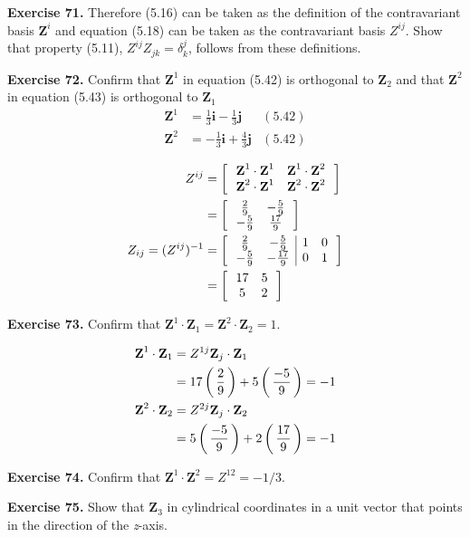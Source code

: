 \documentclass[12pt,a4paper]{report}
\newcommand{\BLUE}[1]{\textcolor{blue}{#1}}
\newcommand{\VK}[1]{\textbf{#1}}
\begin{document}
\begin{description}
\item \textbf{Exercise 71.}  Therefore (5.16) can be taken as the definition of the contravariant basis $\VK{Z}^i$ and equation (5.18) can be taken as the contravariant basis $Z^{ij}$.  Show that property (5.11), $Z^{ij}Z_{jk}=\delta^j_k$, follows from these definitions.  

\item \textbf{Exercise 72.}  Confirm that $\VK{Z}^1$ in equation (5.42) is orthogonal to $\VK{Z}_2$ and that $\VK{Z}^2$ in equation (5.43) is orthogonal to $\VK{Z}_1$
\begin{align*}
	\VK{Z}^1 &= \frac{1}{3}\textbf{i}-\frac{1}{3}\textbf{j} & (5.42) \\
	\VK{Z}^2 &= -\frac{1}{3}\textbf{i}+\frac{4}{3}\textbf{j} & (5.42)
\end{align*}

\BLUE{\begin{align*}
	Z^{ij} &= \SQTWOXTWO{\VK{Z}^1\cdot\VK{Z}^1}{\VK{Z}^1\cdot\VK{Z}^2}{\VK{Z}^2\cdot\VK{Z}^1}{\VK{Z}^2\cdot\VK{Z}^2} \\
	&= \SQTWOXTWO{\frac{2}{9}}{-\frac{5}{9}}{-\frac{5}{9}}{\frac{17}{9}} \\
	Z_{ij} = (Z^{ij})^{-1} &= \SQBRACKET{\begin{array}{cc|cc}
		\frac{2}{9} & -\frac{5}{9} & 1 & 0 \\
		-\frac{5}{9} & -\frac{17}{9} & 0 & 1 
	\end{array} } \\
	&= \SQTWOXTWO{17}{5}{5}{2}
\end{align*}
}

\item \textbf{Exercise 73.} Confirm that $\VK{Z}^1\cdot\VK{Z}_1=\VK{Z}^2\cdot\VK{Z}_2=1$.

\BLUE{\begin{align*}
	\VK{Z}^1 \cdot \VK{Z}_1 &= Z^{1j}\VK{Z}_j \cdot \VK{Z}_1 \\
	&= 17\PAREN{\frac{2}{9}}+5\PAREN{\frac{-5}{9}} = -1 \\
	\VK{Z}^2 \cdot \VK{Z}_2 &= Z^{2j}\VK{Z}_j \cdot \VK{Z}_2 \\
	&= 5\PAREN{\frac{-5}{9}}+2\PAREN{\frac{17}{9}} = -1
\end{align*}
}

\item \textbf{Exercise 74.} Confirm that $\VK{Z}^1\cdot\VK{Z}^2 = Z^{12}=-1/3$.

\item \textbf{Exercise 75.} Show that $\VK{Z}_3$ in cylindrical coordinates in a unit vector that points in the direction of the \textit{z}-axis.


\end{description}
\end{document}
